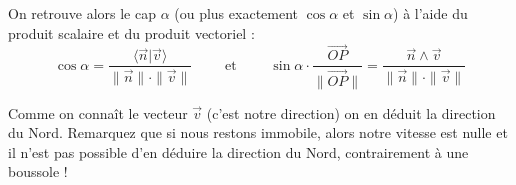 \documentclass[class=report,crop=false]{standalone}
\newcommand{\vect}{\overrightarrow}
\begin{document}
 

On retrouve alors le cap $\alpha$ (ou plus exactement $\cos \alpha$ et $\sin \alpha$) 
à l'aide du produit scalaire et du produit vectoriel :
$$\cos \alpha  = \frac{\langle \vect n | \vect v\rangle}{\| \vect n \| \cdot \| \vect v \|}
\qquad \text{ et } \qquad
\sin \alpha \cdot \frac{\vect{OP}}{\|\vect{OP} \|} = \frac{ \vect n \wedge \vect v}{\| \vect n \| \cdot \| \vect v \|}
$$

Comme on connaît le vecteur $\vect v$ (c'est notre direction) on en déduit la direction du Nord.
Remarquez que si nous restons immobile, alors notre vitesse est nulle et il n'est pas possible
d'en déduire la direction du Nord, contrairement à une boussole !




\end{document}
